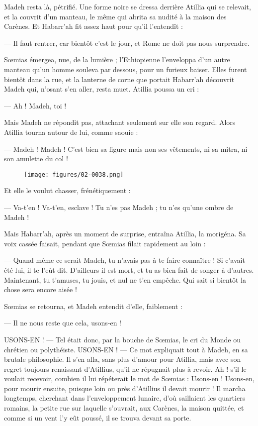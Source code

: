 \documentclass[a4paper, 11pt, oneside, polutonikogreek, french]{article}
\begin{document}
Madeh resta là, pétrifié. Une forme noire se dressa derrière Atillia qui se relevait, et la couvrit d'un manteau, le même qui abrita sa nudité à la maison des Carènes. Et Habarr'ah fit assez haut pour qu'il l'entendît :

--- Il faut rentrer, car bientôt c'est le jour, et Rome ne doit pas nous surprendre.

Sœmias émergea, nue, de la lumière ; l'Ethiopienne l'enveloppa d'un autre manteau qu'un homme souleva par dessous, pour un furieux baiser. Elles furent bientôt dans la rue, et la lanterne de corne que portait Habarr'ah découvrit Madeh qui, n'osant s'en aller, resta muet. Atillia poussa un cri :

--- Ah ! Madeh, toi !

Mais Madeh ne répondit pas, attachant seulement sur elle son regard. Alors Atillia tourna autour de lui, comme saouie :

--- Madeh ! Madeh ! C'est bien sa figure mais non ses vêtements, ni sa mitra, ni son amulette du col !
\begin{figure}[H]
\centering
\texttt{[image: figures/02-0038.png]}
\end{figure}
Et elle le voulut chasser, frénétiquement :

--- Va-t'en ! Va-t'en, esclave ! Tu n'es pas Madeh ; tu n'es qu'une ombre de Madeh !

Mais Habarr'ah, après un moment de surprise, entraîna Atillia, la morigéna. Sa voix cassée faisait, pendant que Sœmias filait rapidement au loin :

--- Quand même ce serait Madeh, tu n'avais pas à te faire connaître ! Si c'avait été lui, il te l'eût dit. D'ailleurs il est mort, et tu as bien fait de songer à d'autres. Maintenant, tu t'amuses, tu jouis, et nul ne t'en empêche. Qui sait si bientôt la chose sera encore aisée !

Sœmias se retourna, et Madeh entendit d'elle, faiblement :

--- Il ne nous reste que cela, usons-en !

USONS-EN ! --- Tel était donc, par la bouche de Sœmias, le cri du Monde ou chrétien ou polythéiste. USONS-EN ! --- Ce mot expliquait tout à Madeh, en sa brutale philosophie. Il s'en alla, sans plus d'amour pour Atillia, mais avec son regret toujours renaissant d'Atillius, qu'il ne répugnait plus à revoir. Ah ! s'il le voulait recevoir, combien il lui répéterait le mot de Sœmias : Usons-en ! Usons-en, pour mourir ensuite, puisque loin ou près d'Atillius il devait mourir ! Il marcha longtemps, cherchant dans l'enveloppement lunaire, d'où saillaient les quartiers romains, la petite rue sur laquelle s'ouvrait, aux Carènes, la maison quittée, et comme si un vent l'y eût poussé, il se trouva devant sa porte.
\end{document}
